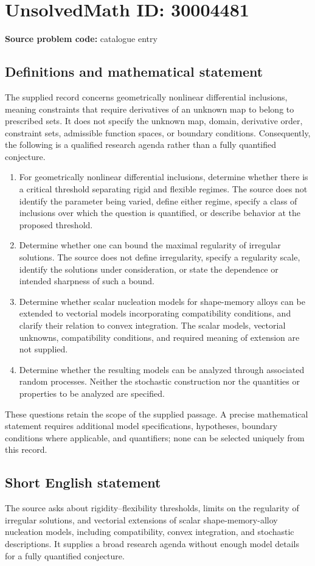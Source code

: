\documentclass[11pt]{article}
\begin{document}
\section*{UnsolvedMath ID: 30004481}
\textbf{Source problem code:} catalogue entry
\subsection{Definitions and mathematical statement}
The supplied record concerns geometrically nonlinear differential inclusions, meaning constraints that require derivatives of an unknown map to belong to prescribed sets. It does not specify the unknown map, domain, derivative order, constraint sets, admissible function spaces, or boundary conditions. Consequently, the following is a qualified research agenda rather than a fully quantified conjecture.

\begin{enumerate}
\item For geometrically nonlinear differential inclusions, determine whether there is a critical threshold separating rigid and flexible regimes. The source does not identify the parameter being varied, define either regime, specify a class of inclusions over which the question is quantified, or describe behavior at the proposed threshold.
\item Determine whether one can bound the maximal regularity of irregular solutions. The source does not define irregularity, specify a regularity scale, identify the solutions under consideration, or state the dependence or intended sharpness of such a bound.
\item Determine whether scalar nucleation models for shape-memory alloys can be extended to vectorial models incorporating compatibility conditions, and clarify their relation to convex integration. The scalar models, vectorial unknowns, compatibility conditions, and required meaning of extension are not supplied.
\item Determine whether the resulting models can be analyzed through associated random processes. Neither the stochastic construction nor the quantities or properties to be analyzed are specified.
\end{enumerate}

These questions retain the scope of the supplied passage. A precise mathematical statement requires additional model specifications, hypotheses, boundary conditions where applicable, and quantifiers; none can be selected uniquely from this record.
\subsection{Short English statement}
The source asks about rigidity--flexibility thresholds, limits on the regularity of irregular solutions, and vectorial extensions of scalar shape-memory-alloy nucleation models, including compatibility, convex integration, and stochastic descriptions. It supplies a broad research agenda without enough model details for a fully quantified conjecture.
\end{document}
